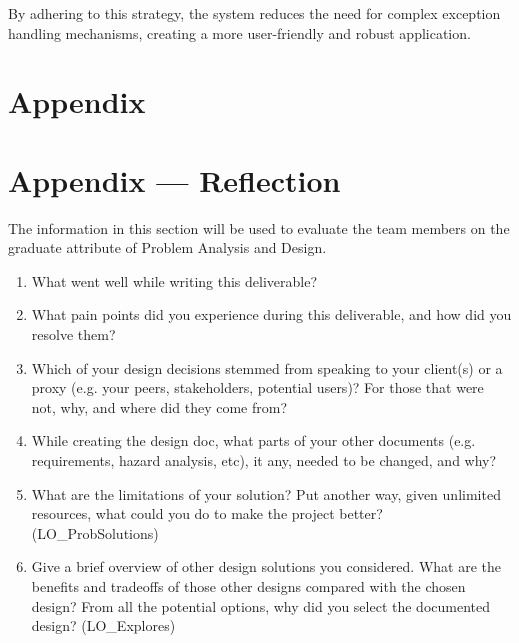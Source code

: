\documentclass[12pt, titlepage]{article}
\begin{document}
By adhering to this strategy, the system reduces the need for complex exception handling mechanisms, creating a more user-friendly and robust application.



\newpage{}

\section{Appendix} \label{Appendix}


\newpage{}

\section*{Appendix --- Reflection}


The information in this section will be used to evaluate the team members on the
graduate attribute of Problem Analysis and Design.



\begin{enumerate}
  \item What went well while writing this deliverable? 
  \item What pain points did you experience during this deliverable, and how
    did you resolve them?
  \item Which of your design decisions stemmed from speaking to your client(s)
  or a proxy (e.g. your peers, stakeholders, potential users)? For those that
  were not, why, and where did they come from?
  \item While creating the design doc, what parts of your other documents (e.g.
  requirements, hazard analysis, etc), it any, needed to be changed, and why?
  \item What are the limitations of your solution?  Put another way, given
  unlimited resources, what could you do to make the project better? (LO\_ProbSolutions)
  \item Give a brief overview of other design solutions you considered.  What
  are the benefits and tradeoffs of those other designs compared with the chosen
  design?  From all the potential options, why did you select the documented design?
  (LO\_Explores)
\end{enumerate}
\end{document}
